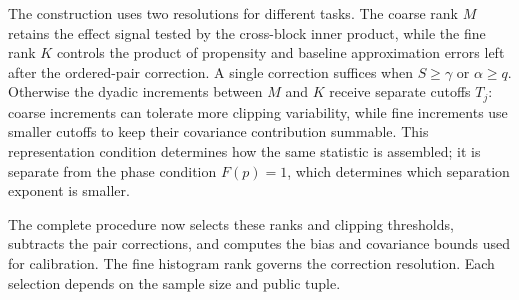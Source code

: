 \documentclass[11pt]{article}
\begin{document}
The construction uses two resolutions for different tasks. The coarse rank \(M\) retains the effect signal tested by the cross-block inner product, while the fine rank \(K\) controls the product of propensity and baseline approximation errors left after the ordered-pair correction. A single correction suffices when \(S\ge\gamma\) or \(\alpha\ge q\). Otherwise the dyadic increments between \(M\) and \(K\) receive separate cutoffs \(T_j\): coarse increments can tolerate more clipping variability, while fine increments use smaller cutoffs to keep their covariance contribution summable. This representation condition determines how the same statistic is assembled; it is separate from the phase condition \(F(p)=1\), which determines which separation exponent is smaller.

The complete procedure now selects these ranks and clipping thresholds, subtracts the pair corrections, and computes the bias and covariance bounds used for calibration. The fine histogram rank  governs the correction resolution. Each selection depends on the sample size and public tuple.
\end{document}
